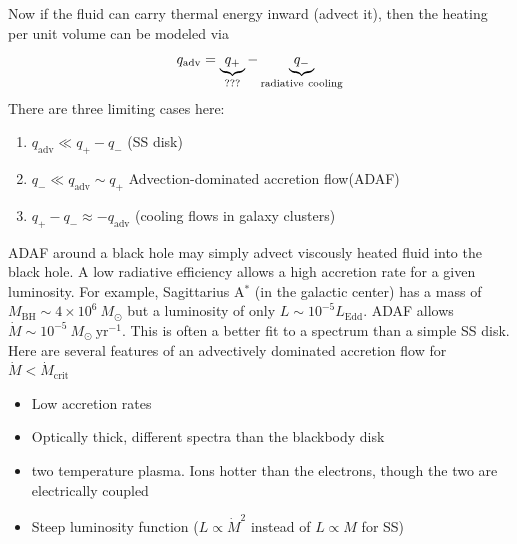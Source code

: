 \documentclass[10pt]{article}
\numberwithin{equation}{section}
\newcommand{\n}{\noindent}
\begin{document}
\n Now if the fluid can carry thermal energy inward (advect it), then the heating per unit volume can be modeled via
\begin{equation}
	\label{eq:general:1} q_{\mathrm{adv}} = \underbrace{q_+}_{???}-\underbrace{q_-}_{\rm radiative\ cooling}
\end{equation}
There are three limiting cases here:
\begin{enumerate}
	\item $q_{\mathrm{adv}} \ll q_+ - q_-$ (SS disk)
	\item $q_- \ll q_{\mathrm{adv}}\sim q_+$ Advection-dominated accretion flow(ADAF)
	\item $q_+ - q_- \approx -q_{\mathrm{adv}}$ (cooling flows in galaxy clusters)
\end{enumerate}
ADAF around a black hole may simply advect viscously heated fluid into the black hole. A low radiative efficiency allows a high accretion rate for a given luminosity. For example, Sagittarius A$^*$ (in the galactic center) has a mass of $M_{\mathrm{BH}}\sim 4\times 10^6\ M_\odot$ but a luminosity of only $L\sim 10^{-5}L_{\mathrm{Edd}}$. ADAF allows $\dot{M}\sim 10^{-5}\ M_\odot\ \mathrm{yr^{-1}}$. This is often a better fit to a spectrum than a simple SS disk.\\

\n Here are several features of an advectively dominated accretion flow for $\dot{M}<\dot{M}_{\mathrm{crit}}$
\begin{itemize}
	\item Low accretion rates
	\item Optically thick, different spectra than the blackbody disk
	\item two temperature plasma. Ions hotter than the electrons, though the two are electrically coupled
	\item Steep luminosity function ($L\propto \dot{M}^2$ instead of $L\propto M$ for SS)
\end{itemize}
\end{document}
